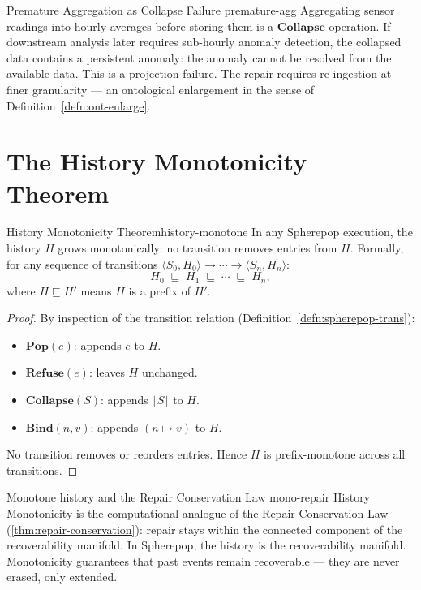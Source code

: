 \documentclass[12pt,twoside,openright]{book}
\newcommand{\csicon} {\marginpar{\tiny\color{DistBlue}\faCode}}
\begin{document}
\begin{example}{Premature Aggregation as Collapse Failure}%
  {premature-agg}
  \csicon
  Aggregating sensor readings into hourly averages before
  storing them is a $\mathbf{Collapse}$ operation. If
  downstream analysis later requires sub-hourly anomaly
  detection, the collapsed data contains a persistent
  anomaly: the anomaly cannot be resolved from the
  available data. This is a projection failure. The repair
  requires re-ingestion at finer granularity — an
  ontological enlargement in the sense of
  Definition~\ref{defn:ont-enlarge}.
\end{example}

\section{The History Monotonicity Theorem}

\begin{theorem}{History Monotonicity Theorem}{history-monotone}
  In any Spherepop execution, the history $H$ grows
  monotonically: no transition removes entries from $H$.
  Formally, for any sequence of transitions
  $\langle S_0, H_0 \rangle \to \cdots \to
  \langle S_n, H_n \rangle$:
  \[
    H_0 \;\sqsubseteq\; H_1 \;\sqsubseteq\;
    \cdots \;\sqsubseteq\; H_n,
  \]
  where $H \sqsubseteq H'$ means $H$ is a prefix of $H'$.
\end{theorem}

\begin{proof}
  By inspection of the transition relation
  (Definition~\ref{defn:spherepop-trans}):
  \begin{itemize}[nosep]
    \item $\mathbf{Pop}(e)$: appends $e$ to $H$.
    \item $\mathbf{Refuse}(e)$: leaves $H$ unchanged.
    \item $\mathbf{Collapse}(S)$: appends $\lfloor S \rfloor$
          to $H$.
    \item $\mathbf{Bind}(n,v)$: appends $(n \mapsto v)$
          to $H$.
  \end{itemize}
  No transition removes or reorders entries. Hence $H$
  is prefix-monotone across all transitions.
\end{proof}

\begin{remark}{Monotone history and the Repair Conservation Law}%
  {mono-repair}
  History Monotonicity is the computational analogue of
  the Repair Conservation Law
  (\cref{thm:repair-conservation}): repair stays within
  the connected component of the recoverability manifold.
  In Spherepop, the history is the recoverability manifold.
  Monotonicity guarantees that past events remain
  recoverable — they are never erased, only extended.
\end{remark}
\end{document}
